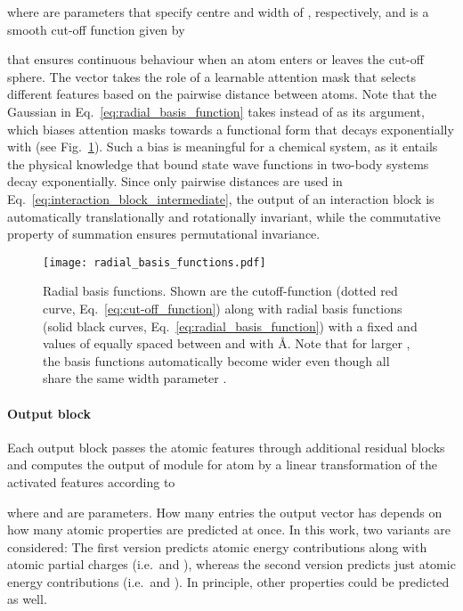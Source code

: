 \documentclass[12pt]{article}
\begin{document}
where  are parameters that specify centre and width of , respectively, 
and  is a smooth cut-off function given by\cite{ebert2003texturing}

that ensures continuous behaviour when an atom enters or leaves the
cut-off sphere. The vector  takes the role of a learnable attention
mask\cite{mnih2014recurrent} that selects different features based on
the pairwise distance  between atoms. Note that the Gaussian
in Eq.~\ref{eq:radial_basis_function} takes  instead of
 as its argument, which biases attention masks towards a
functional form that decays exponentially with  (see
Fig.~\ref{fig:radial_basis_functions}). Such a bias is meaningful for
a chemical system, as it entails the physical knowledge that bound
state wave functions in two-body systems decay exponentially. Since
only pairwise distances are used in
Eq.~\ref{eq:interaction_block_intermediate}, the output of an
interaction block is automatically translationally and rotationally
invariant, while the commutative property of summation ensures
permutational invariance.\cite{o1973exponential}

\begin{figure}[htbp]
\centering
\texttt{[image: radial\_basis\_functions.pdf]}
\caption{Radial basis functions. Shown are the cutoff-function
   (dotted red curve, Eq.~\ref{eq:cut-off_function}) along
  with  radial basis functions  (solid black
  curves, Eq.~\ref{eq:radial_basis_function}) with a fixed  and
  values of  equally spaced between  and
   with  \AA. Note that for larger , the basis
  functions automatically become wider even though all  share
  the same width parameter .}
\label{fig:radial_basis_functions}
\end{figure}

\paragraph{Output block}
Each output block passes the atomic features through  additional residual blocks and computes the
output  of module 
for atom  by a linear transformation of the activated features
according to

where 
and  are
parameters. How many entries the output vector 
has depends on how many atomic properties are predicted at once. In
this work, two variants are considered: The first version predicts
atomic energy contributions along with atomic partial charges
(i.e.\  and ), whereas the
second version predicts just atomic energy contributions
(i.e.\  and ). In principle, other properties could be predicted as
well.
\end{document}
